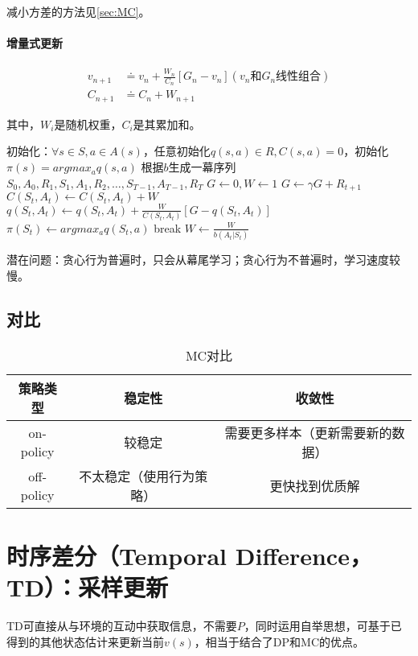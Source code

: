 \documentclass[
12pt, %
a4paper, 
oneside, %
headinclude,footinclude, %
]{scrartcl}
\begin{document}
减小方差的方法见\ref{sec:MC}。
\paragraph{增量式更新}
\begin{align*}
v_{n + 1} &\doteq v_n + \frac{W_n}{C_n}[G_n - v_n] (v_n \text{和} G_n \text{线性组合}) \\
C_{n + 1} &\doteq C_n + W_{n + 1}
\end{align*}

其中，$ W_i $是随机权重，$ C_i $是其累加和。
\begin{myalgorithm}
\State 初始化：$ \forall s \in S, a \in A(s) $，任意初始化$ q(s,a) \in R, C(s,a) = 0 $，初始化$ \pi(s) = argmax_a q(s,a) $ 
\Loop
\State 根据$ b $生成一幕序列$ S_0, A_0, R_1, S_1, A_1, R_2, \dots, S_{T - 1}, A_{T - 1}, R_T $ 
\State $ G \gets 0, W \gets 1 $
\State $ G \gets \gamma G + R_{t + 1} $
\State $ C(S_t, A_t) \gets C(S_t, A_t) + W $
\State $ q(S_t ,A_t) \gets q(S_t, A_t) + \frac{W}{C(S_t, A_t)}[G - q(S_t, A_t)] $ 
\State $ \pi(S_t) \gets argmax_a q(S_t,a) $
\State break 
\EndIf
\State $ W \gets \frac{W}{b(A_t|S_t)} $ 
\EndFor
\EndLoop
\end{myalgorithm}

潜在问题：贪心行为普遍时，只会从幕尾学习；贪心行为不普遍时，学习速度较慢。
\subsection[对比]{对比}
\begin{table}[H]
\centering
\caption{MC对比}
\begin{tabular}{|c|c|c|}
\hline
策略类型 & 稳定性 & 收敛性 \\
\hline
on-policy & 较稳定 & 需要更多样本（更新需要新的数据） \\
\hline
off-policy & 不太稳定（使用行为策略） & 更快找到优质解 \\
\hline
\end{tabular}
\end{table}
\section[时序差分]{时序差分（Temporal Difference，TD）：采样更新}
TD可直接从与环境的互动中获取信息，不需要$ P $，同时运用自举思想，可基于已得到的其他状态估计来更新当前$ v(s) $，相当于结合了DP和MC的优点。
\end{document}
